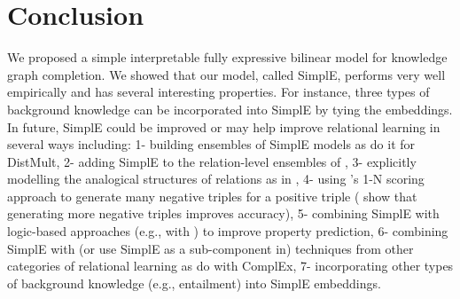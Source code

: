 \documentclass{article}
\begin{document}
\section{Conclusion}
We proposed a simple interpretable fully expressive bilinear model for knowledge graph completion. We showed that our model, called SimplE, performs very well empirically and has several interesting properties. For instance, three types of background knowledge can be incorporated into SimplE by tying the embeddings. In future, SimplE could be improved or may help improve relational learning in several ways including: 1- building ensembles of SimplE models as \cite{kadlec2017knowledge} do it for DistMult, 2- adding SimplE to the relation-level ensembles of \cite{wang2017multi}, 3- explicitly modelling the analogical structures of relations as in \cite{liu2017analogical}, 4- using \cite{dettmers2018convolutional}'s 1-N scoring approach to generate many negative triples for a positive triple (\citet{trouillon2016complex} show that generating more negative triples improves accuracy), 5- combining SimplE with logic-based approaches (e.g., with \cite{kazemi2018relnn}) to improve property prediction, 6- combining SimplE with (or use SimplE as a sub-component in) techniques from other categories of relational learning as \cite{rocktaschel2017end} do with ComplEx, 7- incorporating other types of background knowledge (e.g., entailment) into SimplE embeddings.



\end{document}
